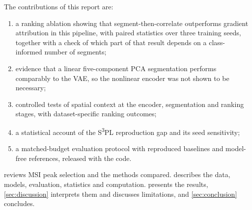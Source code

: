 The contributions of this report are:
\begin{enumerate}
  \item a ranking ablation showing that segment-then-correlate outperforms
        gradient attribution in this pipeline, with paired statistics over
        three training seeds, together with a check of which part of that result depends
        on a class-informed number of segments;
  \item evidence that a linear five-component PCA segmentation performs
        comparably to the VAE, so the nonlinear encoder was not shown to be
        necessary;
  \item controlled tests of spatial context at the encoder, segmentation and
        ranking stages, with dataset-specific ranking outcomes;
  \item a statistical account of the S\textsuperscript{3}PL reproduction gap and
        its seed sensitivity;
  \item a matched-budget evaluation protocol with reproduced baselines and
        model-free references, released with the code.
\end{enumerate}
 reviews MSI peak selection and the methods compared.
 describes the data, models, evaluation, statistics and
computation.  presents the results, \cref{sec:discussion}
interprets them and discusses limitations, and \cref{sec:conclusion}
concludes.
